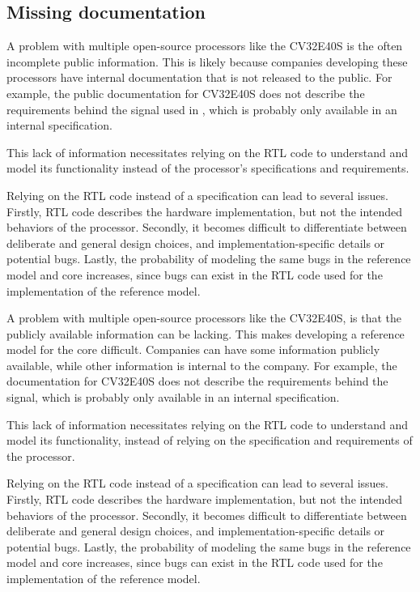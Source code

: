 \subsection{Missing documentation}


A problem with multiple open-source processors like the CV32E40S is the often incomplete public information. This is likely because companies developing these processors have internal documentation that is not released to the public. For example, the public documentation for CV32E40S \cite{openhwgroupIntroductionCOREVCV32E40S2023} does not describe the requirements behind the  signal used in , which is probably only available in an internal specification.

This lack of information necessitates relying on the RTL code to understand and model its functionality instead of the processor's specifications and requirements.

Relying on the RTL code instead of a specification can lead to several issues. Firstly, RTL code describes the hardware implementation, but not the intended behaviors of the processor. Secondly, it becomes difficult to differentiate between deliberate and general design choices, and implementation-specific details or potential bugs. Lastly, the probability of modeling the same bugs in the reference model and core increases, since bugs can exist in the RTL code used for the implementation of the reference model.



A problem with multiple open-source processors like the CV32E40S, is that the publicly available information can be lacking. This makes developing a reference model for the core difficult. Companies can have some information publicly available, while other information is internal to the company. For example, the documentation for CV32E40S \cite{openhwgroupIntroductionCOREVCV32E40S2023} does not describe the requirements behind the  signal, which is probably only available in an internal specification.

This lack of information necessitates relying on the RTL code to understand and model its functionality, instead of relying on the specification and requirements of the processor.

Relying on the RTL code instead of a specification can lead to several issues. Firstly, RTL code describes the hardware implementation, but not the intended behaviors of the processor. Secondly, it becomes difficult to differentiate between deliberate and general design choices, and implementation-specific details or potential bugs. Lastly, the probability of modeling the same bugs in the reference model and core increases, since bugs can exist in the RTL code used for the implementation of the reference model.


